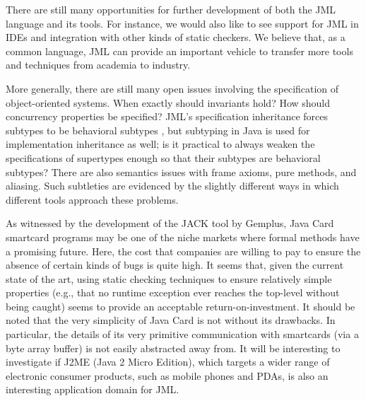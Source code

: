\documentclass{entcs}
\begin{document}

\smallskip

There are still many opportunities for further development of both the
JML language and its tools.  For instance, we would also like to see
support for JML in IDEs and integration with other kinds of static
checkers.  We believe that, as a common language, JML can provide an
important vehicle to transfer more tools and techniques from academia
to industry.

More generally, there are still many open issues involving the
specification of object-oriented systems.  When exactly should
invariants hold?  How should concurrency properties be specified?
JML's specification inheritance forces subtypes to be behavioral
subtypes \cite{Dhara-Leavens96,Leavens-Baker-Ruby03}, but subtyping in
Java is used for implementation inheritance as well; is it practical
to always weaken the specifications of supertypes enough so that their
subtypes are behavioral subtypes?
There are also semantics issues with frame axioms, pure
methods, and aliasing.  Such subtleties are evidenced by the slightly
different ways in which different tools approach these problems.


\smallskip

As witnessed by the development of the JACK tool by Gemplus, Java Card
smartcard programs may be one of the niche markets where formal
methods have a promising future. Here, the cost that companies are
willing to pay to ensure the absence of certain kinds of bugs is quite
high.  It seems that, given the current state of the art, using static
checking techniques to ensure relatively simple properties (e.g., that
no runtime exception ever reaches the top-level without being caught)
seems to provide an acceptable return-on-investment.  It should be
noted that the very simplicity of Java Card is not without its
drawbacks.  In particular, the details of its very primitive
communication with smartcards (via a byte array buffer) is not easily
abstracted away from.  It will be interesting to investigate if J2ME (Java 2
Micro Edition), which targets a wider range of electronic consumer
products, such as mobile phones and PDAs, is also an interesting
application domain for JML\@.
\end{document}
